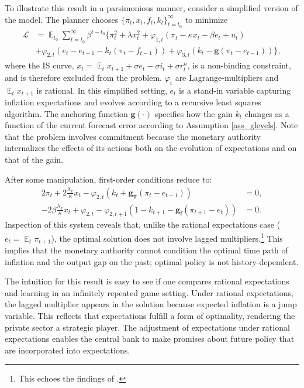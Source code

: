 \documentclass[11pt]{article}
\renewcommand{\[}{\begin{equation}}
\renewcommand{\]}{\end{equation}}
\DeclareMathOperator{\E}{\mathbb{E}}
\begin{document}
To illustrate this result in a parsimonious manner, consider a simplified version of the model. The planner chooses $\{\pi_t, x_t, f_t, k_t\}_{t=t_0}^{\infty}$ to minimize
 \begin{align*}
\mathcal{L} &= \E_{t_0}\sum_{t=t_0}^{\infty} \beta^{t-t_0}\bigg\{ \pi_t^2  + \lambda x_t^2 + \varphi_{1,t} (\pi_t -\kappa x_t- \beta e_t +u_t) \\ &+ \varphi_{2,t}(e_t - e_{t-1} -k_t(\pi_t - f_{t-1})) + \varphi_{3,t}(k_t - \mathbf{g}(\pi_t - e_{t-1})) \bigg\},
 \end{align*}
 where the IS curve, $x_t = \E_t x_{t+1}+\sigma e_t -\sigma i_t +\sigma r_t^n$, is a non-binding constraint, and is therefore excluded from the problem. $\varphi_i$ are Lagrange-multipliers and $\E_t x_{t+1}$ is rational. In this simplified setting, $e_t$ is a stand-in variable capturing inflation expectations and evolves according to a recursive least squares algorithm. The anchoring function $\mathbf{g}(\cdot)$ specifies how the gain $k_t$ changes as a function of the current forecast error according to Assumption \ref{ass_glevels}. Note that the problem involves commitment because the monetary authority internalizes the effects of its actions both on the evolution of expectations and on that of the gain. 
 
 After some manipulation, first-order conditions reduce to:
 \begin{align}
  2\pi_t +2\frac{\lambda_x}{\kappa}x_t -\varphi_{2,t}(k_t + \mathbf{g_{\pi}}(\pi_t -e_{t-1}))& = 0 \label{simpleFOC1}, \\
  -2\beta\frac{\lambda_x}{\kappa}x_t + \varphi_{2,t} -\varphi_{2,t+1}(1-k_{t+1} -\mathbf{g_{f}}(\pi_{t+1} -e_{t})) & = 0 \label{simpleFOC2}. 
 \end{align}
Inspection of this system reveals that, unlike the rational expectations case ($e_t = \E_t{\pi_{t+1}}$), the optimal solution does not involve lagged multipliers.\footnote{This echoes the findings of \cite{molnar2014optimal}.} This implies that the monetary authority cannot condition the optimal time path of inflation and the output gap on the past; optimal policy is not history-dependent. 

The intuition for this result is easy to see if one compares rational expectations and learning in an infinitely repeated game setting. Under rational expectations, the lagged multiplier appears in the solution because expected inflation is a jump variable. This reflects that expectations fulfill a form of optimality, rendering the private sector a strategic player. The adjustment of expectations under rational expectations enables the central bank to make promises about future policy that are incorporated into expectations. 
\end{document}
